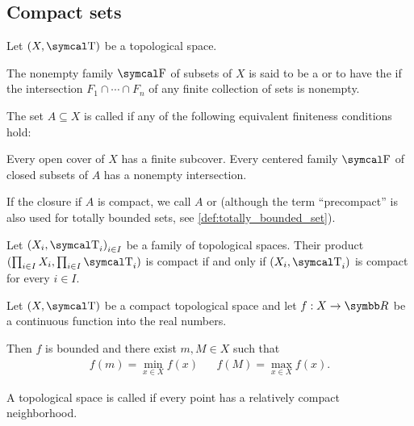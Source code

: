 \subsection{Compact sets}\label{subsec:compact_sets}

Let \( (X, \T) \) be a topological space.

\begin{definition}\label{def:centered_family}\cite[123]{Engelking1989}
  The nonempty family \( \F \) of subsets of \( X \) is said to be a  or to have the  if the intersection \( F_1 \cap \cdots \cap F_n \) of any finite collection of sets is nonempty.
\end{definition}

\begin{definition}\label{def:compact_set}\cite[123]{Engelking1989}
  The set \( A \subseteq X \) is called  if any of the following equivalent finiteness conditions hold:
  \begin{defenum}
     Every open cover of \( X \) has a finite subcover.
     Every centered family \( \F \) of closed subsets of \( A \) has a nonempty intersection.
  \end{defenum}

  If the closure if \( A \) is compact, we call \( A \)  or  (although the term \enquote{precompact} is also used for totally bounded sets, see \ref{def:totally_bounded_set}).
\end{definition}

\begin{theorem}\label{thm:tychonoffs_product_theorem}\cite[theorem 3.2.4]{Engelking1989}
  Let \( { (X_i, \T_i) }_{i \in I} \) be a family of topological spaces. Their product \( (\prod_{i \in I} X_i, \prod_{i \in I} \T_i) \) is compact if and only if \( (X_i, \T_i) \) is compact for every \( i \in I \).

\end{theorem}

\begin{theorem}\label{thm:weierstrass_extreme_value_theorem}
  Let \( (X, \T) \) be a compact topological space and let \( f: X \to \R \) be a continuous function into the real numbers.

  Then \( f \) is bounded and there exist \( m, M \in X \) such that
  \begin{align*}
    f(m) = \min_{x \in X} f(x)
    &&
    f(M) = \max_{x \in X} f(x).
  \end{align*}
\end{theorem}

\begin{definition}\label{def:locally_compact_space}\cite[148]{Engelking1989}
  A topological space is called  if every point has a relatively compact neighborhood.
\end{definition}

